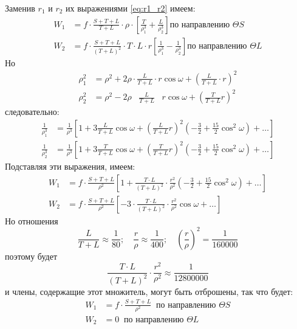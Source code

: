 \documentclass[a4paper,12pt]{article}
\begin{document}
Заменив $r_1$ и $r_2$ их выражениями \eqref{eq:r1_r2} имеем:
\[
\begin{aligned}
	W_1 &= f \cdot \frac{S + T + L}{T + L} \cdot \rho \cdot
	\left[\frac{T}{\rho_1^3} + \frac{L}{\rho_2^3}\right]
	\text{по направлению } \Theta S \\
	W_2 &= f \cdot \frac{S + T + L}{(T + L)^2} \cdot T\cdot  L \cdot r
	\left[\frac{1}{\rho_1^3} - \frac{1}{\rho_2^3}\right]
	\text{по направлению } \Theta L
\end{aligned}
\]
Но
\[
\begin{aligned}
	\rho_1^2 &= \rho^2 + 2\rho \cdot \frac{L}{T + L} \cdot r \cos \omega + 
	\left(\frac{L}{T + L}\cdot r \right)^2 \\
	\rho_2^2 &= \rho^2 - 2\rho \; \; \; \frac{L}{T + L} \; \; \; r \cos \omega + 
	\left(\frac{T}{T + L} r \right)^2
\end{aligned}
\]
следовательно:
\[
\begin{aligned}
	\frac{1}{\rho_1^3} &= \frac{1}{\rho^3} \left[ 1 + 3\frac{L}{T + L} \cos \omega + \left( \frac{L}{T + L} r \right)^2\left( -\frac{3}{2} + \frac{15}{2} \cos^2 \omega \right) + \dots \right] \\
	\frac{1}{\rho_2^3} &= \frac{1}{\rho^3} \left[ 1 + 3\frac{T}{T + L} \cos \omega + \left( \frac{T}{T + L} r \right)^2\left( -\frac{3}{2} + \frac{15}{2} \cos^2 \omega \right) + \dots \right] 
\end{aligned}
\]
Подставляя эти выражения, имеем:
\[
\begin{aligned}
	W_1 &= f \cdot \frac{S + T + L}{\rho^2}
	\left[ 1 + \frac{T \cdot L}{(T + L)^2} \cdot \frac{r^2}{\rho^2} 
	\left( -\frac{3}{2} + \frac{15}{2} \cos^2 \omega \right) + \dots \right] \\
	W_2 &= f \cdot \frac{S + T + L}{\rho^2}
	\left[ -3 \cdot \frac{T \cdot L}{(T + L)^2} \cdot \frac{r^2}{\rho^2} 
	\cos \omega + \dots \right]
\end{aligned}
\]
Но отношения
\[
	\frac{L}{T + L} \approx \frac{1}{80}; \quad 
	\frac{r}{\rho} \approx \frac{1}{400}; \quad 
	\left( \frac{r}{\rho} \right)^2 = \frac{1}{160000}
\]
поэтому будет 
\[
	\frac{T \cdot L}{(T + L)^2} \cdot \frac{r^2}{\rho^2} \approx \frac{1}{12800000}
\]
и члены, содержащие этот множитель, могут быть отброшены, так что будет:
\[
\begin{aligned}
	W_1 &= f \cdot \frac{S + T + L}{\rho^2} ~ \text{ по направлению } \Theta S \\
	W_2 &= 0 ~ \text{ по направлению } \Theta L
\end{aligned}
\]
\end{document}
